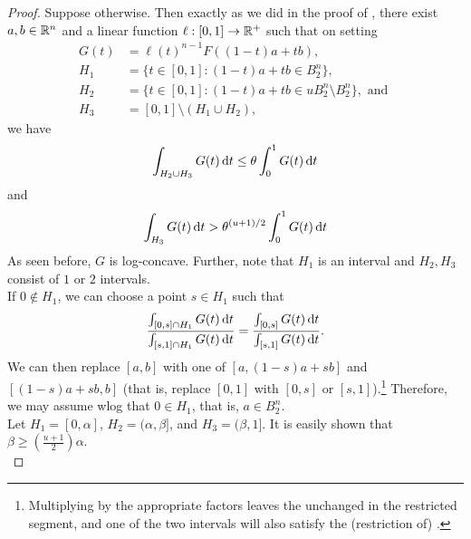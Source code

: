 \begin{proof}
	Suppose otherwise. Then exactly as we did in the proof of , there exist $a,b\in\mathbb{R}^n$ and a linear function $\ell:[0,1]\to\mathbb{R}^+$ such that on setting
	\begin{align*}
		G(t) &= \ell(t)^{n-1}F((1-t)a+tb),\\
		H_1 &= \{t\in[0,1]: (1-t)a+tb\in B_2^n\},\\
		H_2 &= \{t\in[0,1]: (1-t)a+tb\in uB_2^n\setminus B_2^n\},\text{ and }\\
		H_3 &= [0,1]\setminus(H_1\cup H_2),
	\end{align*}
	we have
	\begin{equation}
	\label{eqn: 4.16}
		\int_{H_2\cup H_3} G(t)\operatorname{d}\!{t} \leq \theta\int_0^1 G(t)\operatorname{d}\!{t}
	\end{equation}
	and
	\begin{equation}
	\label{eqn: 4.17}
		\int_{H_3} G(t)\operatorname{d}\!{t} > \theta^{(u+1)/2}\int_0^1 G(t)\operatorname{d}\!{t}
	\end{equation}
	As seen before, $G$ is log-concave. Further, note that $H_1$ is an interval and $H_2,H_3$ consist of $1$ or $2$ intervals.\\

	If $0\not\in H_1$, we can choose a point $s\in H_1$ such that
	\[ \frac{\int_{[0,s]\cap H_1} G(t)\operatorname{d}\!{t}}{\int_{[s,1]\cap H_1} G(t)\operatorname{d}\!{t}} = \frac{\int_{[0,s]} G(t)\operatorname{d}\!{t}}{\int_{[s,1]} G(t)\operatorname{d}\!{t}}. \]
	We can then replace $[a,b]$ with one of $[a,(1-s)a+sb]$ and $[(1-s)a+sb,b]$ (that is, replace $[0,1]$ with $[0,s]$ or $[s,1]$).\footnote{Multiplying by the appropriate factors leaves the  unchanged in the restricted segment, and one of the two intervals will also satisfy the (restriction of) .} Therefore, we may assume wlog that $0\in H_1$, that is, $a\in B_2^n$.\\
	Let $H_1=[0,\alpha]$, $H_2=(\alpha,\beta]$, and $H_3=(\beta,1]$. It is easily shown that $\beta \geq (\frac{u+1}{2})\alpha$.\\


\end{proof}
